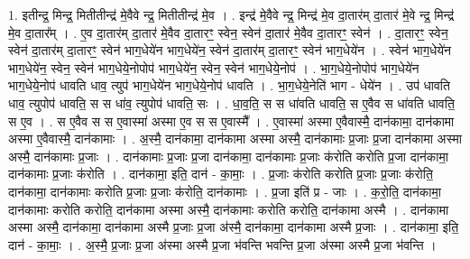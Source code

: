\documentclass[17pt]{extarticle}
\begin{document}
1. इतीन्द्र॒ मिन्द्र॒ मितीतीन्द्र॑ मे॒वैवे न्द्र॒ मितीतीन्द्र॑ मे॒व । . इन्द्र॑ मे॒वैवे न्द्र॒ मिन्द्र॑ मे॒व दा॒तार॑म् दा॒तार॑ मे॒वे न्द्र॒ मिन्द्र॑ मे॒व दा॒तार᳚म् । . ए॒व दा॒तार॑म् दा॒तार॑ मे॒वैव दा॒तारꣳ॒॒ स्वेन॒ स्वेन॑ दा॒तार॑ मे॒वैव दा॒तारꣳ॒॒ स्वेन॑ । . दा॒तारꣳ॒॒ स्वेन॒ स्वेन॑ दा॒तार॑म् दा॒तारꣳ॒॒ स्वेन॑ भाग॒धेये॑न भाग॒धेये॑न॒ स्वेन॑ दा॒तार॑म् दा॒तारꣳ॒॒ स्वेन॑ भाग॒धेये॑न । . स्वेन॑ भाग॒धेये॑न भाग॒धेये॑न॒ स्वेन॒ स्वेन॑ भाग॒धेये॒नोपोप॑ भाग॒धेये॑न॒ स्वेन॒ स्वेन॑ भाग॒धेये॒नोप॑ । . भा॒ग॒धेये॒नोपोप॑ भाग॒धेये॑न भाग॒धेये॒नोप॑ धावति धाव॒ त्युप॑ भाग॒धेये॑न भाग॒धेये॒नोप॑ धावति । . भा॒ग॒धेये॒नेति॑ भाग - धेये॑न । . उप॑ धावति धाव॒ त्युपोप॑ धावति॒ स स धा॑व॒ त्युपोप॑ धावति॒ सः । . धा॒व॒ति॒ स स धा॑वति धावति॒ स ए॒वैव स धा॑वति धावति॒ स ए॒व । . स ए॒वैव स स ए॒वास्मा॑ अस्मा ए॒व स स ए॒वास्मै᳚ । . ए॒वास्मा॑ अस्मा ए॒वैवास्मै॒ दान॑कामा॒ दान॑कामा अस्मा ए॒वैवास्मै॒ दान॑कामाः । . अ॒स्मै॒ दान॑कामा॒ दान॑कामा अस्मा अस्मै॒ दान॑कामाः प्र॒जाः प्र॒जा दान॑कामा अस्मा अस्मै॒ दान॑कामाः प्र॒जाः । . दान॑कामाः प्र॒जाः प्र॒जा दान॑कामा॒ दान॑कामाः प्र॒जाः क॑रोति करोति प्र॒जा दान॑कामा॒ दान॑कामाः प्र॒जाः क॑रोति । . दान॑कामा॒ इति॒ दान॑ - का॒माः॒ । . प्र॒जाः क॑रोति करोति प्र॒जाः प्र॒जाः क॑रोति॒ दान॑कामा॒ दान॑कामाः करोति प्र॒जाः प्र॒जाः क॑रोति॒ दान॑कामाः । . प्र॒जा इति॑ प्र - जाः । . क॒रो॒ति॒ दान॑कामा॒ दान॑कामाः करोति करोति॒ दान॑कामा अस्मा अस्मै॒ दान॑कामाः करोति करोति॒ दान॑कामा अस्मै । . दान॑कामा अस्मा अस्मै॒ दान॑कामा॒ दान॑कामा अस्मै प्र॒जाः प्र॒जा अ॑स्मै॒ दान॑कामा॒ दान॑कामा अस्मै प्र॒जाः । . दान॑कामा॒ इति॒ दान॑ - का॒माः॒ । . अ॒स्मै॒ प्र॒जाः प्र॒जा अ॑स्मा अस्मै प्र॒जा भ॑वन्ति भवन्ति प्र॒जा अ॑स्मा अस्मै प्र॒जा भ॑वन्ति । \newline
\end{document}
